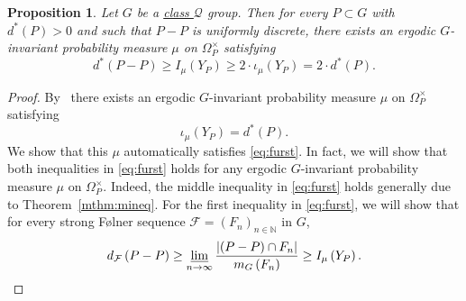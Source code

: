 \documentclass{amsart}
\numberwithin{equation}{subsection}
\newtheorem{prop}[thm]{Proposition}
\theoremstyle{remark}
\begin{document}
\begin{prop}\label{prop:furst}
Let \(G\) be a \hyperlink{classQ}{class \(\mathcal{Q}\)} group. Then for every \(P\subset G\) with \(d^{\ast}\left(P\right)>0\) and such that \(P-P\) is uniformly discrete, there exists an ergodic \(G\)-invariant probability measure \(\mu\) on \(\Omega_{P}^{\times}\) satisfying
\begin{equation}\label{eq:furst}
d^{\ast}\left(P-P\right)\geq I_{\mu}\left(Y_{P}\right)\geq 2\cdot\iota_{\mu}\left(Y_{P}\right)=2\cdot d^{\ast}\left(P\right).
\end{equation}
\end{prop}

\begin{proof}
By~\cite[Theorem 3.1]{BjFi2024} there exists an ergodic \(G\)-invariant probability measure \(\mu\) on \(\Omega_{P}^{\times}\) satisfying
\[\iota_{\mu}\left(Y_{P}\right)=d^{\ast}\left(P\right).\]
We show that this \(\mu\) automatically satisfies \eqref{eq:furst}. In fact, we will show that both inequalities in \eqref{eq:furst} holds for any ergodic \(G\)-invariant probability measure \(\mu\) on \(\Omega_{P}^{\times}\). Indeed, the middle inequality in \eqref{eq:furst} holds generally due to Theorem~\ref{mthm:mineq}. For the first inequality in \eqref{eq:furst}, we will show that for every strong F\o lner sequence \(\mathcal{F}=\left(F_{n}\right)_{n\in\mathbb{N}}\) in \(G\),
\begin{equation}\label{eq:firstineq}
d_{\mathcal{F}}\left(P-P\right)\geq\varliminf_{n\to\infty}\frac{\left|\left(P-P\right)\cap F_{n}\right|}{m_{G}\left(F_{n}\right)}\geq I_{\mu}\left(Y_{P}\right).
\end{equation}


\end{proof}
\end{document}
